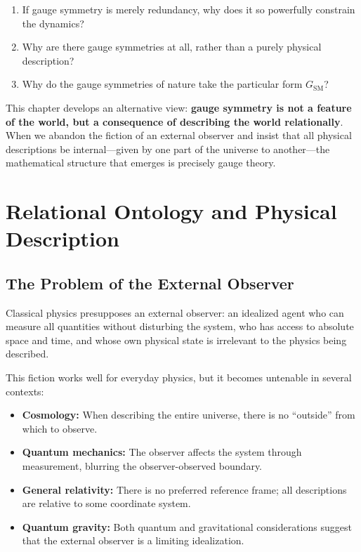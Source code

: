 \documentclass[11pt,a4paper,openright]{book}
\theoremstyle{plain}
\theoremstyle{definition}
\newcommand{\SM}{\mathrm{SM}}
\begin{document}
\begin{enumerate}
    \item If gauge symmetry is merely redundancy, why does it so powerfully constrain the dynamics?
    \item Why are there gauge symmetries at all, rather than a purely physical description?
    \item Why do the gauge symmetries of nature take the particular form $G_{\SM}$?
\end{enumerate}

This chapter develops an alternative view: \textbf{gauge symmetry is not a feature of the world, but a consequence of describing the world relationally}. When we abandon the fiction of an external observer and insist that all physical descriptions be internal---given by one part of the universe to another---the mathematical structure that emerges is precisely gauge theory.

\section{Relational Ontology and Physical Description}

\subsection{The Problem of the External Observer}

Classical physics presupposes an external observer: an idealized agent who can measure all quantities without disturbing the system, who has access to absolute space and time, and whose own physical state is irrelevant to the physics being described.

This fiction works well for everyday physics, but it becomes untenable in several contexts:

\begin{itemize}
    \item \textbf{Cosmology:} When describing the entire universe, there is no ``outside'' from which to observe.
    
    \item \textbf{Quantum mechanics:} The observer affects the system through measurement, blurring the observer-observed boundary.
    
    \item \textbf{General relativity:} There is no preferred reference frame; all descriptions are relative to some coordinate system.
    
    \item \textbf{Quantum gravity:} Both quantum and gravitational considerations suggest that the external observer is a limiting idealization.
\end{itemize}
\end{document}
